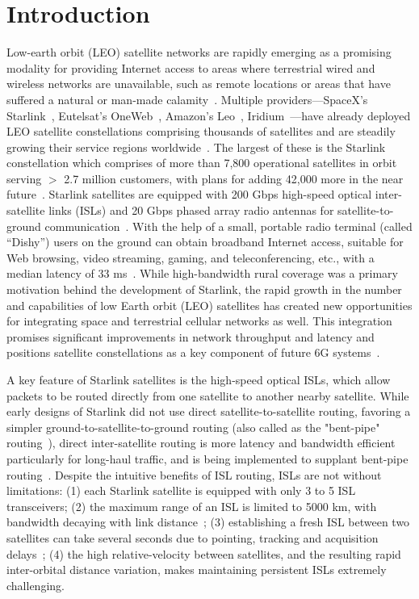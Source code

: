 \documentclass[acmsmall, screen]{acmart}
\begin{document}
\section{Introduction}
Low-earth orbit (LEO) satellite networks are rapidly emerging as a promising modality for providing Internet access to areas where terrestrial wired and wireless networks are unavailable, such as remote locations or areas that have suffered a natural or man-made calamity~\cite{ma2023network,hurricanehelene,starlinkrussiaukraine,starlinkmaritime,starlinkemergency}. Multiple providers---SpaceX's Starlink~\cite{starlink}, Eutelsat's OneWeb~\cite{oneweb}, Amazon's Leo~\cite{leo}, Iridium~\cite{iridium}---have already deployed LEO satellite constellations comprising thousands of satellites and are steadily growing their service regions worldwide~\cite{starlinkavailability}. The largest of these is the Starlink constellation which comprises of more than 7,800 operational satellites in orbit serving $>$ 2.7 million customers, with plans for adding 42,000 more in the near future~\cite{starlinknetupdate,starlinknumfuture,mohan2024multifaceted}. Starlink satellites are equipped with 200 Gbps high-speed optical inter-satellite links (ISLs) and 20 Gbps phased array radio antennas for satellite-to-ground communication~\cite{starlinkstech, starlinkbandwidthusa}. With the help of a small, portable radio terminal (called ``Dishy'') users on the ground can obtain broadband Internet access, suitable for Web browsing, video streaming, gaming, and teleconferencing, etc., with a median latency of 33 ms~\cite{starlinklatency}. While high-bandwidth rural coverage was a primary motivation behind the development of Starlink, the rapid growth in the number and capabilities of low Earth orbit (LEO) satellites has created new opportunities for integrating space and terrestrial cellular networks as well. This integration promises significant improvements in network throughput and latency and positions satellite constellations as a key component of future 6G systems~\cite{xiao2022leo, andrews20246}.

A key feature of Starlink satellites is the high-speed optical ISLs, which allow packets to be routed directly from one satellite to another nearby satellite. 
While early designs of Starlink did not use direct satellite-to-satellite routing, favoring a simpler ground-to-satellite-to-ground routing (also called as the "bent-pipe" routing~\cite{abubakar2024choosing}), direct inter-satellite routing is more latency and bandwidth efficient particularly for long-haul traffic, and is being implemented to supplant bent-pipe routing~\cite{chen20243, hauri2020internet}.
Despite the intuitive benefits of ISL routing, ISLs are not without limitations: (1) each Starlink satellite is equipped with only 3 to 5 ISL transceivers; (2) the maximum range of an ISL is limited to 5000 km, with bandwidth decaying with link distance~\cite{chaudhry2021laser, shang2025channel}; (3) establishing a fresh ISL between two satellites can take several seconds due to pointing, tracking and acquisition delays~\cite{carrizo2020optical, brashears2024achieving}; (4) the high relative-velocity between satellites, and the resulting rapid inter-orbital distance variation, makes maintaining persistent ISLs extremely challenging.
\end{document}
